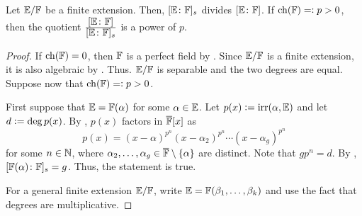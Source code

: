 \begin{prop}
    Let $\mathbb{E}/\mathbb{F}$ be a finite extension. Then, $[\mathbb{E}\colon\mathbb{F}]_s$ divides $[\mathbb{E}\colon\mathbb{F}]$. If $\operatorname{ch}(\mathbb{F}) =\vcentcolon p > 0$, then the quotient $\frac{\displaystyle [\mathbb{E}\colon\mathbb{F}]}{\displaystyle [\mathbb{E}\colon\mathbb{F}]_s}$ is a power of $p$.
\end{prop}
\begin{proof}
    If $\operatorname{ch}(\mathbb{F}) = 0$, then $\mathbb{F}$ is a perfect field by . Since $\mathbb{E}/\mathbb{F}$ is a finite extension, it is also algebraic by . Thus. $\mathbb{E}/\mathbb{F}$ is separable and the two degrees are equal. Suppose now that $\operatorname{ch}(\mathbb{F}) =\vcentcolon p > 0$.
    
    First suppose that $\mathbb{E} = \mathbb{F}(\alpha)$ for some $\alpha \in \mathbb{E}$. Let $p(x) \vcentcolon= \operatorname{irr}(\alpha, \mathbb{E})$ and let $d \vcentcolon= \deg p(x)$. By , $p(x)$ factors in $\overline{\mathbb{F}}[x]$ as
    \[
        p(x) = (x-\alpha)^{p^n} (x-\alpha_2)^{p^n} \cdots (x-\alpha_g)^{p^n}
    \]
    for some $n \in \mathbb{N}$, where $\alpha_2,\ldots,\alpha_g \in \overline{\mathbb{F}} \setminus \{\alpha\}$ are distinct. Note that $gp^n = d$. By , $[\mathbb{F}(\alpha) \colon \mathbb{F}]_s = g$. Thus, the statement is true. 
    
    For a general finite extension $\mathbb{E}/\mathbb{F}$, write $\mathbb{E} = \mathbb{F}(\beta_1, \ldots, \beta_k)$ and use the fact that degrees are multiplicative. 
\end{proof}